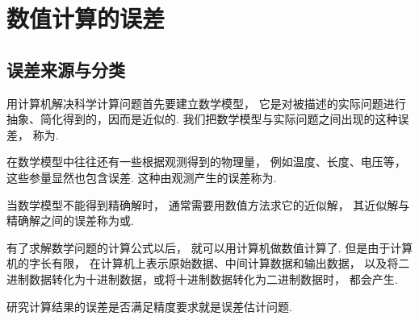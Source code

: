 \section{数值计算的误差}
\subsection{误差来源与分类}
用计算机解决科学计算问题首先要建立数学模型，
它是对被描述的实际问题进行抽象、简化得到的，因而是近似的.
我们把数学模型与实际问题之间出现的这种误差，
称为.

在数学模型中往往还有一些根据观测得到的物理量，
例如温度、长度、电压等，
这些参量显然也包含误差.
这种由观测产生的误差称为.

当数学模型不能得到精确解时，
通常需要用数值方法求它的近似解，
其近似解与精确解之间的误差称为或.

有了求解数学问题的计算公式以后，
就可以用计算机做数值计算了.
但是由于计算机的字长有限，
在计算机上表示原始数据、中间计算数据和输出数据，
以及将二进制数据转化为十进制数据，或将十进制数据转化为二进制数据时，
都会产生.

研究计算结果的误差是否满足精度要求就是误差估计问题.
